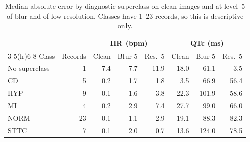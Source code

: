 \begin{table}[ht]
\centering\small
\caption{Median absolute error by diagnostic superclass on clean images and at level~5 of blur and of low resolution. Classes have 1--23 records, so this is descriptive only.}\label{tab:class}
\begin{tabular}{@{}lrrrrrrr@{}}
\toprule
 & & \multicolumn{3}{c}{HR (bpm)} & \multicolumn{3}{c}{QTc (ms)} \\
\cmidrule(lr){3-5}\cmidrule(lr){6-8}
Class & Records & Clean & Blur 5 & Res.\ 5 & Clean & Blur 5 & Res.\ 5 \\
\midrule
No superclass & 1 & 7.4 & 7.7 & 11.9 & 18.0 & 61.1 & 3.5 \\
CD & 5 & 0.2 & 1.7 & 1.8 & 3.5 & 66.9 & 56.4 \\
HYP & 9 & 0.1 & 1.6 & 3.8 & 22.3 & 101.9 & 58.6 \\
MI & 4 & 0.2 & 2.9 & 7.4 & 27.7 & 99.0 & 66.0 \\
NORM & 23 & 0.1 & 1.1 & 2.9 & 19.1 & 88.3 & 82.3 \\
STTC & 7 & 0.1 & 2.0 & 0.7 & 13.6 & 124.0 & 78.5 \\
\bottomrule
\end{tabular}
\end{table}